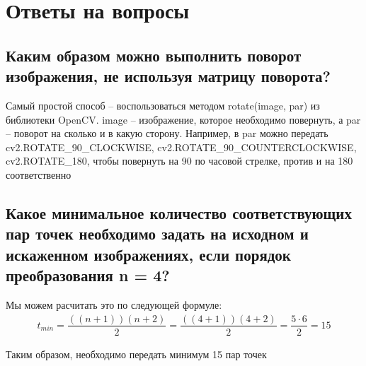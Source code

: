 \documentclass[a4paper, 16pt]{article}
\begin{document}
\section{Ответы на вопросы}
\subsection{Каким образом можно выполнить поворот изображения, не используя матрицу поворота?}
\noindent Самый простой способ -- воспользоваться методом rotate(image, par) из библиотеки OpenCV.
image -- изображение, которое необходимо повернуть, а par -- поворот на сколько и в какую сторону.
Например, в par можно передать cv2.ROTATE\_{90}\_{CLOCKWISE}, cv2.ROTATE\_{90}\_{COUNTERCLOCKWISE}, cv2.ROTATE\_{180},
чтобы повернуть на 90 по часовой стрелке, против и на 180 соответственно


\subsection{Какое минимальное количество соответствующих пар точек необходимо задать на исходном и искаженном изображениях, если порядок преобразования n = 4?}
\noindent Мы можем расчитать это по следующей формуле:
\begin{align*}
    t_{min}=\dfrac{\left(\left(n+1\right)\right)\left(n+2\right)}{2}=\dfrac{\left(\left(4+1\right)\right)\left(4+2\right)}{2}=\dfrac{5\cdot6}{2}=15
\end{align*}


\noindent Таким образом, необходимо передать минимум 15 пар точек
\end{document}
